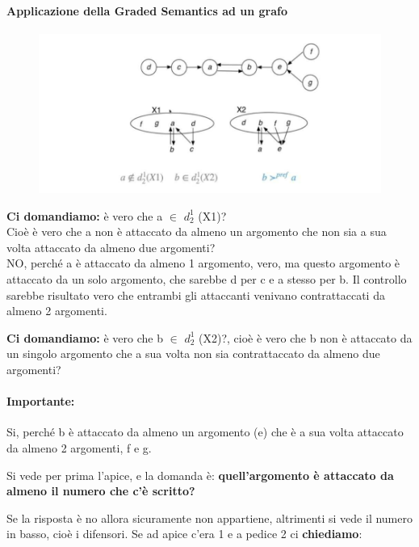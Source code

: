 \paragraph{Applicazione della Graded Semantics ad un grafo}
\begin{figure}[H]
    \centering
    \includegraphics[width=12cm, keepaspectratio]{img/Cap8/GdefnseGrafo.png}
\end{figure}
\textbf{Ci domandiamo:} è vero che a $\in$ $d^1_2$ (X1)? \\Cioè è
vero che a non è attaccato da almeno un argomento che non sia a sua volta
attaccato da almeno due argomenti? \\NO, perché a è attaccato da almeno 1
argomento, vero, ma questo argomento è attaccato da un solo argomento, che
sarebbe d per c e a stesso per b. Il controllo sarebbe risultato vero che
entrambi gli attaccanti venivano contrattaccati da almeno 2 argomenti.

\vspace{0.4cm}

\noindent \textbf{Ci domandiamo:} è vero che b $\in$ $d^1_2$ (X2)?, cioè è
vero che b non è attaccato da un singolo argomento che a sua volta non sia
contrattaccato da almeno due argomenti?

\paragraph{Importante:} Si, perché b è attaccato da almeno un
argomento (e) che è a sua volta attaccato da almeno 2 argomenti, f e g.

\vspace{0.3cm}

\noindent Si vede per prima l'apice, e la domanda è: \textbf{quell'argomento
    è attaccato da almeno il numero che c'è scritto?}

\vspace{0.3cm}

\noindent Se la risposta è no allora sicuramente non appartiene, altrimenti
si vede il numero in basso, cioè i difensori.
\vspace{0.3cm}
\noindent Se ad apice c'era 1 e a pedice 2 ci \textbf{chiediamo}:

